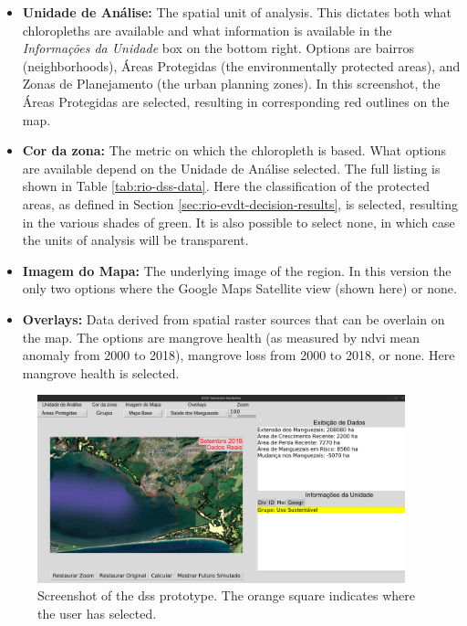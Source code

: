 \begin{itemize}[itemsep=0pt,parsep=0pt]
	\item{\textbf{Unidade de Análise:} The spatial unit of analysis. This dictates both what chloropleths are available and what information is available in the \textit{Informações da Unidade} box on the bottom right. Options are bairros (neighborhoods), Áreas Protegidas (the environmentally protected areas), and Zonas de Planejamento (the urban planning zones). In this screenshot, the Áreas Protegidas are selected, resulting in corresponding red outlines on the map.}
	\item{\textbf{Cor da zona:} The metric on which the chloropleth is based. What options are available depend on the Unidade de Análise selected. The full listing is shown in Table \ref{tab:rio-dss-data}. Here the classification of the protected areas, as defined in Section \ref{sec:rio-evdt-decision-results}, is selected, resulting in the various shades of green. It is also possible to select none, in which case the units of analysis will be transparent.}
	\item{\textbf{Imagem do Mapa:} The underlying image of the region. In this version the only two options where the Google Maps Satellite view (shown here) or none.}
	\item{\textbf{Overlays:} Data derived from spatial raster sources that can be overlain on the map. The options are mangrove health (as measured by \ac{ndvi} mean anomaly from 2000 to 2018), mangrove loss from 2000 to 2018, or none. Here mangrove health is selected.} 
\end{itemize}

\begin{figure}[!htb] 
\centering
\includegraphics[width=0.95\textwidth]{Figures/chap4/rio-dss-screenshot.png}
\caption[Screenshot of Rio de Janeiro DSS]{Screenshot of the \ac{dss} prototype. The orange square indicates where the user has selected.}
\label{fig:rio-dss-screenshot}
\end{figure}

